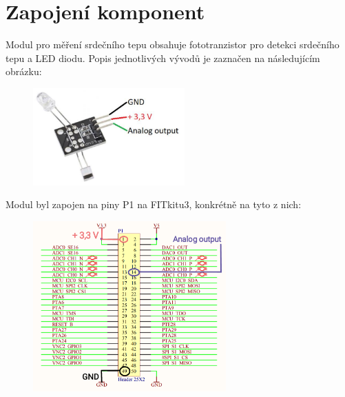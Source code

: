 \documentclass[a4paper, 11pt]{article}
\begin{document}
\section{Zapojení komponent}
Modul pro měření srdečního tepu obsahuje fototranzistor pro detekci srdečního tepu a LED diodu. Popis jednotlivých vývodů je zaznačen na následujícím obrázku: 
\begin{figure}[htbp]
    \centering
    \includegraphics[width=220]{modulzapojeni.PNG}
\end{figure}
Modul byl zapojen na piny P1 na FITkitu3, konkrétně na tyto z nich:
\begin{figure}[htbp]
    \centering
    \includegraphics[width=280]{IMG_20191215_184411.png}
\end{figure}
\end{document}

